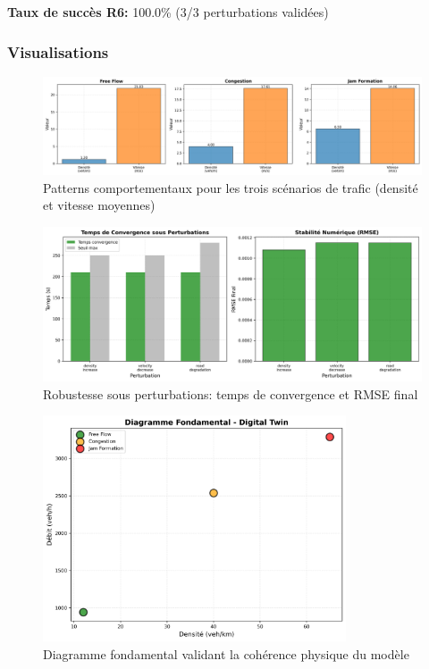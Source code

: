\textbf{Taux de succès R6:} 100.0\% (3/3 perturbations validées)


\subsubsection{Visualisations}

\begin{figure}[htbp]
\centering
\includegraphics[width=\textwidth]{images/fig_behavioral_patterns.png}
\caption{Patterns comportementaux pour les trois scénarios de trafic (densité et vitesse moyennes)}
\label{fig:behavioral_patterns}
\end{figure}

\begin{figure}[htbp]
\centering
\includegraphics[width=\textwidth]{images/fig_robustness_perturbations.png}
\caption{Robustesse sous perturbations: temps de convergence et RMSE final}
\label{fig:robustness_perturbations}
\end{figure}

\begin{figure}[htbp]
\centering
\includegraphics[width=0.8\textwidth]{images/fig_fundamental_diagram.png}
\caption{Diagramme fondamental validant la cohérence physique du modèle}
\label{fig:fundamental_diagram}
\end{figure}

